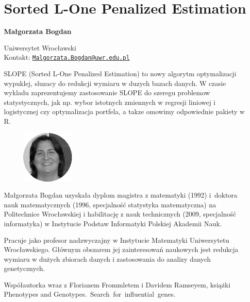 \documentclass[\main/boa.tex]{subfiles}
\begin{document}
\section{Sorted L-One Penalized Estimation}


\begin{minipage}{0.915\textwidth}
	\centering
  {\bf \LARGE {} Małgorzata Bogdan}
\end{minipage}




\begin{affiliations}
\begin{minipage}{0.915\textwidth}
\centering
\large Uniwersytet Wrocławski  \\[1pt]
Kontakt: \href{mailto:Malgorzata.Bogdan@uwr.edu.pl}{\nolinkurl{Malgorzata.Bogdan@uwr.edu.pl}}\\
\end{minipage}
\end{affiliations}


SLOPE (Sorted L-One Penalized Estimation) to nowy algorytm optymalizacji wypuklej, sluzacy do redukcji wymiaru w duzych bazach danych. W czasie wykladu zaprezentujemy zastosowanie SLOPE do szeregu problemow statystycznych, jak np. wybor istotnych zmiennych w regresji liniowej i logistycznej czy optymalizacja portfela, a takze omowimy odpowiednie pakiety w R. 

\bio
\begin{figure}
    \includegraphics[width=100px]{img/guests/czarno_biale/mbogdan-crop.png}
\end{figure} 
Małgorzata Bogdan uzyskała dyplom magistra z matematyki (1992) i~doktora nauk matematycznych (1996, specjalność statystyka matematyczna) na Politechnice Wrocławskiej i habilitację z nauk technicznych (2009, specjalność informatyka) w Instytucie Podstaw Informatyki Polskiej Akademii Nauk.

Pracuje jako profesor nadzwyczajny w Instytucie Matematyki Uniwersytetu Wrocławskiego. Głównym obszarem jej zainteresowań naukowych jest redukcja wymiaru w dużych zbiorach danych i zastosowania do analizy danych genetycznych.

Współautorka wraz z Florianem Frommletem i Davidem Ramseyem, książki Phenotypes and Genotypes.~Search~for~influential~genes.
\end{document}
